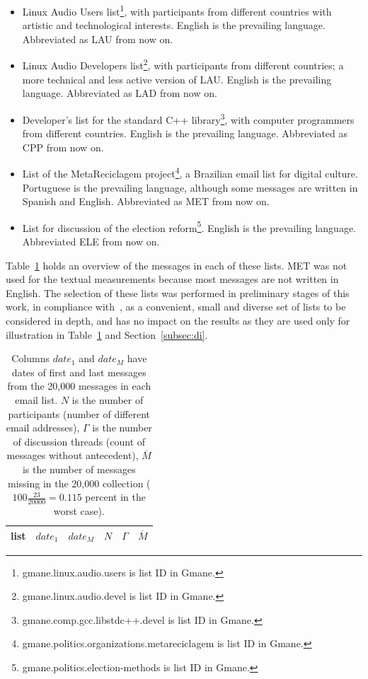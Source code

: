 \documentclass[review]{elsarticle}
\begin{document}
\begin{itemize}
\item Linux Audio Users list\footnote{gmane.linux.audio.users is list ID in Gmane.}, with participants from different countries with artistic and technological interests. English is the prevailing language. Abbreviated as LAU from now on.
\item Linux Audio Developers list\footnote{gmane.linux.audio.devel is list ID in Gmane.}, with participants from different countries; a more technical and less active version of LAU. English is the prevailing language. Abbreviated as LAD from now on.
\item Developer's list for the standard C++ library\footnote{gmane.comp.gcc.libstdc++.devel is list ID in Gmane.}, with computer programmers from different countries. English is the prevailing language. Abbreviated as CPP from now on.
\item List of the MetaReciclagem project\footnote{gmane.politics.organizations.metareciclagem is list ID in Gmane.}, a Brazilian email list for digital culture. Portuguese is the prevailing language, although some messages are written in Spanish and English. Abbreviated as MET from now on.
\item List for discussion of the election reform\footnote{gmane.politics.election-methods is list ID in Gmane.}. English is the prevailing language. Abbreviated ELE from now on.
\end{itemize} 

Table~\ref{tab:genLists} holds an overview of the messages in each of these lists.
MET was not used for the textual measurements because most messages are not written in English.
The selection of these lists was performed in preliminary stages of this work,
in compliance with~\cite{stab,thesis}, as a convenient, small and diverse set of lists to be considered in depth, and has no impact on the results as they are used only for illustration in Table~\ref{tab:genLists} and Section~\ref{subsec:di}.

\begin{table}
\centering
\caption{Columns $date_1$ and $date_M$ have dates of first and last messages from the 20,000 messages in each email list.
$N$ is the number of participants (number of different email addresses),
$\Gamma$ is the number of discussion threads (count of messages without antecedent),
$\overline{M}$ is the number of messages missing in the 20,000 collection
($100\frac{23}{20000}=0.115$ percent in the worst case).
}
	\def\arraystretch{1.2}
\label{tab:genLists}
\begin{tabular}{l|c c c c c}
list & $date_1$ & $date_{M}$ & $N$ & $\Gamma$ & $\overline{M}$ \\\hline

\end{tabular}
\end{table} 
\end{document}
